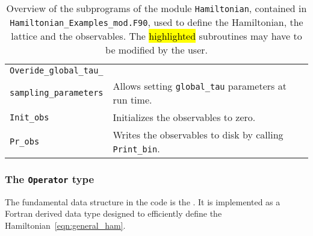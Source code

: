 \begin{table}[h]
\begin{center}
\begin{tabular}{@{} l l l @{}}
    \texttt{Overide\_global\_tau\_} & & \\
    \texttt{sampling\_parameters}  & Allows setting \texttt{global\_tau} parameters at run time. & \\    
    \texttt{Init\_obs}  & Initializes the observables to zero. & \\    
    \texttt{Pr\_obs}    & Writes the observables to disk by calling \texttt{Print\_bin}. \\\bottomrule    
   \end{tabular}
   \caption{Overview of the subprograms of the  module \texttt{Hamiltonian}, contained in \texttt{Hamiltonian\_Examples\_mod.F90}, used to define the Hamiltonian, the lattice and the observables. The \hl{highlighted} subroutines may have to be modified by the user.
    \label{table:hamiltonian}}
\end{center}
\end{table}
%

\subsubsection{The \texttt{Operator} type}\label{sec:op}

The fundamental data structure in the code is the . It is implemented as a Fortran derived data type designed to efficiently define the Hamiltonian~\eqref{eqn:general_ham}.

